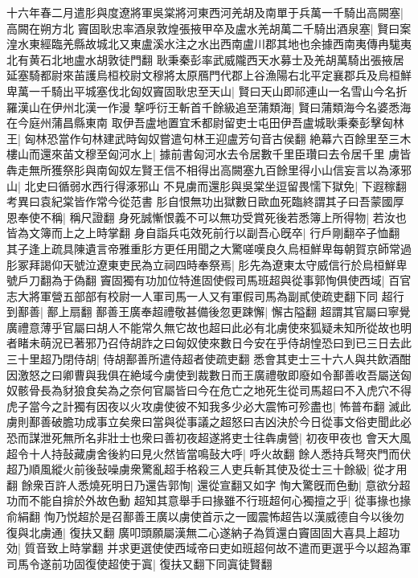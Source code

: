 十六年春二月遣肜與度遼將軍吳棠將河東西河羌胡及南單于兵萬一千騎出高闕塞|{
	高闕在朔方北}
竇固耿忠率酒泉敦煌張掖甲卒及盧水羌胡萬二千騎出酒泉塞|{
	賢曰案湟水東經臨羌縣故城北又東盧溪水注之水出西南盧川郡其地也余據西南夷傳冉駹夷北有黄石北地盧水胡敦徒門翻}
耿秉秦彭率武威隴西天水募士及羌胡萬騎出張掖居延塞騎都尉來苖護烏桓校尉文穆將太原鴈門代郡上谷漁陽右北平定襄郡兵及烏桓鮮卑萬一千騎出平城塞伐北匈奴竇固耿忠至天山|{
	賢曰天山即祁連山一名雪山今名折羅漢山在伊州北漢一作漫}
撃呼衍王斬首千餘級追至蒲類海|{
	賢曰蒲類海今名婆悉海在今庭州蒲昌縣東南}
取伊吾盧地置宜禾都尉留吏士屯田伊吾盧城耿秉秦彭擊匈林王|{
	匈林恐當作句林建武時匈奴嘗遣句林王迎盧芳句音古侯翻}
絶幕六百餘里至三木樓山而還來苖文穆至匈河水上|{
	據前書匈河水去令居數千里臣瓚曰去令居千里}
虜皆犇走無所獲祭肜與南匈奴左賢王信不相得出高闕塞九百餘里得小山信妄言以為涿邪山|{
	北史曰循弱水西行得涿邪山}
不見虜而還肜與吳棠坐逗留畏懦下獄免|{
	下遐稼翻　考異曰袁紀棠皆作常今從范書}
肜自恨無功出獄數日歐血死臨終謂其子曰吾蒙國厚恩奉使不稱|{
	稱尺證翻}
身死誠慚恨義不可以無功受賞死後若悉簿上所得物|{
	若汝也皆為文簿而上之上時掌翻}
身自詣兵屯效死前行以副吾心旣卒|{
	行戶剛翻卒子恤翻}
其子逢上疏具陳遺言帝雅重肜方更任用聞之大驚嗟嘆良久烏桓鮮卑每朝賀京師常過肜冢拜謁仰天號泣遼東吏民為立祠四時奉祭焉|{
	肜先為遼東太守威信行於烏桓鮮卑號戶刀翻為于偽翻}
竇固獨有功加位特進固使假司馬班超與從事郭恂俱使西域|{
	百官志大將軍營五部部有校尉一人軍司馬一人又有軍假司馬為副貳使疏吏翻下同}
超行到鄯善|{
	鄯上扇翻}
鄯善王廣奉超禮敬甚備後忽更踈懈|{
	懈古隘翻}
超謂其官屬曰寧覺廣禮意薄乎官屬曰胡人不能常久無它故也超曰此必有北虜使來狐疑未知所從故也明者睹未萌況已著邪乃召侍胡詐之曰匈奴使來數日今安在乎侍胡惶恐曰到已三日去此三十里超乃閉侍胡|{
	侍胡鄯善所遣侍超者使疏吏翻}
悉會其吏士三十六人與共飲酒酣因激怒之曰卿曹與我俱在絶域今虜使到裁數日而王廣禮敬即廢如令鄯善收吾屬送匈奴骸骨長為豺狼食矣為之奈何官屬皆曰今在危亡之地死生從司馬超曰不入虎穴不得虎子當今之計獨有因夜以火攻虜使彼不知我多少必大震怖可殄盡也|{
	怖普布翻}
滅此虜則鄯善破膽功成事立矣衆曰當與從事議之超怒曰吉凶決於今日從事文俗吏聞此必恐而謀泄死無所名非壯士也衆曰善初夜超遂將吏士往犇虜營|{
	初夜甲夜也}
會天大風超令十人持鼔藏虜舍後約曰見火然皆當鳴鼔大呼|{
	呼火故翻}
餘人悉持兵弩夾門而伏超乃順風縱火前後鼔噪虜衆驚亂超手格殺三人吏兵斬其使及從士三十餘級|{
	從才用翻}
餘衆百許人悉燒死明日乃還告郭恂|{
	還從宣翻又如字}
恂大驚旣而色動|{
	意欲分超功而不能自揜於外故色動}
超知其意舉手曰掾雖不行班超何心獨擅之乎|{
	從事掾也掾俞絹翻}
恂乃悦超於是召鄯善王廣以虜使首示之一國震怖超告以漢威德自今以後勿復與北虜通|{
	復扶又翻}
廣叩頭願屬漢無二心遂納子為質還白竇固固大喜具上超功効|{
	質音致上時掌翻}
并求更選使使西域帝曰吏如班超何故不遣而更選乎今以超為軍司馬令遂前功固復使超使于寘|{
	復扶又翻下同寘徒賢翻}
